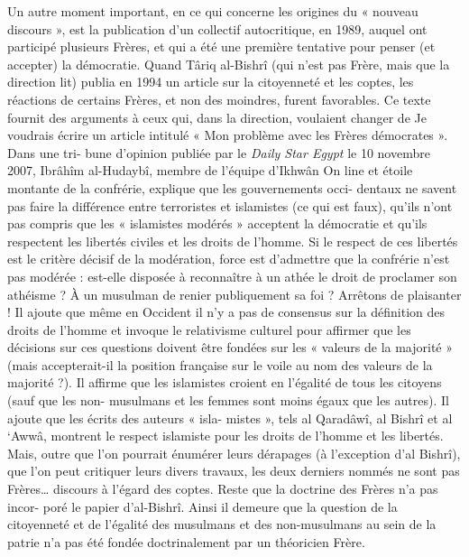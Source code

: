 Un autre moment important, en ce qui concerne les origines du « nouveau
discours », est la publication d'un collectif autocritique, en 1989,
auquel ont participé plusieurs Frères, et qui a été une première
tentative pour penser (et accepter) la démocratie. Quand Târiq al-Bishrî
(qui n'est pas Frère, mais que la direction lit) publia en 1994 un
article sur la citoyenneté et les coptes, les réactions de certains
Frères, et non des moindres, furent favorables. Ce texte fournit des
arguments à ceux qui, dans la direction, voulaient changer de
  Je voudrais écrire un article intitulé « Mon problème avec les Frères
  démocrates ». Dans une tri- bune d'opinion publiée par le \emph{Daily
  Star Egypt} le 10 novembre 2007, Ibrâhîm al-Hudaybî, membre de
  l'équipe d'Ikhwân On line et étoile montante de la confrérie, explique
  que les gouvernements occi- dentaux ne savent pas faire la différence
  entre terroristes et islamistes (ce qui est faux), qu'ils n'ont pas
  compris que les « islamistes modérés » acceptent la démocratie et
  qu'ils respectent les libertés civiles et les droits de l'homme. Si le
  respect de ces libertés est le critère décisif de la modération, force
  est d'admettre que la confrérie n'est pas modérée : est-elle disposée
  à reconnaître à un athée le droit de proclamer son athéisme ? À un
  musulman de renier publiquement sa foi ? Arrêtons de plaisanter ! Il
  ajoute que même en Occident il n'y a pas de consensus sur la
  définition des droits de l'homme et invoque le relativisme culturel
  pour affirmer que les décisions sur ces questions doivent être fondées
  sur les « valeurs de la majorité » (mais accepterait-il la position
  française sur le voile au nom des valeurs de la majorité ?). Il
  affirme que les islamistes croient en l'égalité de tous les citoyens
  (sauf que les non- musulmans et les femmes sont moins égaux que les
  autres). Il ajoute que les écrits des auteurs « isla- mistes », tels
  al Qaradâwî, al Bishrî et al `Awwâ, montrent le respect islamiste pour
  les droits de l'homme et les libertés. Mais, outre que l'on pourrait
  énumérer leurs dérapages (à l'exception d'al Bishrî), que l'on peut
  critiquer leurs divers travaux, les deux derniers nommés ne sont pas
  Frères\ldots{}
discours à l'égard des coptes. Reste que la doctrine des Frères n'a pas
incor- poré le papier d'al-Bishrî. Ainsi il demeure que la question de
la citoyenneté et de l'égalité des musulmans et des non-musulmans au
sein de la patrie n'a pas été fondée doctrinalement par un théoricien
Frère.

